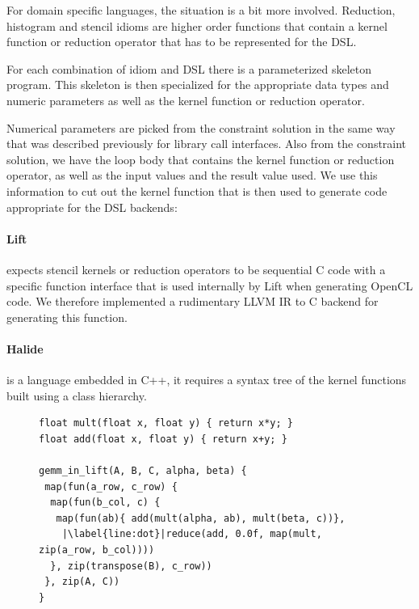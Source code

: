     For domain specific languages, the situation is a bit more involved.
    Reduction, histogram and stencil idioms are higher order functions that
    contain a kernel function or reduction operator that has to be represented
    for the DSL.

    For each combination of idiom and DSL there is a parameterized
    skeleton program.
    This skeleton is then specialized for the appropriate data types and numeric
    parameters as well as the kernel function or reduction operator.

    Numerical parameters are picked from the constraint solution in the same way
    that was described previously for library call interfaces.
    Also from the constraint solution, we have the loop body that contains the
    kernel function or reduction operator, as well as the input values and the
    result value used.
    We use this information to cut out the kernel function that is then used to
    generate code appropriate for the DSL backends:

\paragraph*{Lift}  expects stencil kernels or reduction operators to be sequential C code with a specific function interface that
is used internally by Lift when generating OpenCL code.
We therefore implemented a rudimentary LLVM IR to C backend for generating this function.

\paragraph*{Halide} is a language embedded in C++, it requires a syntax tree of the kernel functions built using a class hierarchy.

\begin{figure}[ht]
\begin{lstlisting}[language=LIFT,escapechar=|,
                   label={fig:liftmxm},caption=
   {Example of matrix multiplication in Lift}]
float mult(float x, float y) { return x*y; }
float add(float x, float y) { return x+y; }

gemm_in_lift(A, B, C, alpha, beta) {
 map(fun(a_row, c_row) {
  map(fun(b_col, c) {
   map(fun(ab){ add(mult(alpha, ab), mult(beta, c))},
    |\label{line:dot}|reduce(add, 0.0f, map(mult, zip(a_row, b_col))))
  }, zip(transpose(B), c_row))
 }, zip(A, C))
}
\end{lstlisting}
\end{figure}

